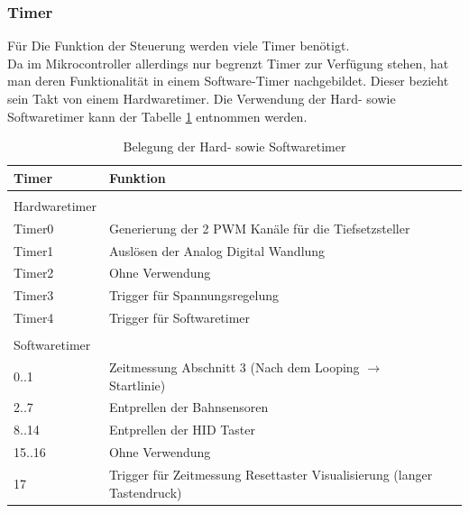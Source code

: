 \documentclass[a4paper, 11pt]{report}
\begin{document}
			\subsubsection{Timer}\label{subsubsec:Timer}
			Für Die Funktion der Steuerung werden viele Timer benötigt.\\
			Da im Mikrocontroller allerdings nur begrenzt Timer zur Verfügung stehen, hat man deren Funktionalität in einem Software-Timer nachgebildet.
			Dieser bezieht sein Takt von einem Hardwaretimer.
			Die Verwendung der Hard- sowie Softwaretimer kann der Tabelle \ref{tab:belegungTimer} entnommen werden.
				\begin{table}[ht]
					\begin{tabular}{|l|l|l|}
						\hline
						\textbf{Timer} & \textbf{Funktion}\\
						\hline
						\hline
						 & \\
						Hardwaretimer &\\
						\hline
						\hline
						Timer0 & Generierung der 2 PWM Kanäle für die Tiefsetzsteller\\
						\hline
						Timer1 & Auslösen der Analog Digital Wandlung\\
						\hline
						Timer2 & Ohne Verwendung\\
						\hline
						Timer3 & Trigger für Spannungsregelung\\
						\hline
						Timer4 & Trigger für Softwaretimer\\
						\hline
						\hline
						 & \\
						Softwaretimer &\\
						\hline
						\hline
						0..1 & Zeitmessung Abschnitt 3 (Nach dem Looping $\rightarrow$ Startlinie)\\
						\hline
						2..7 & Entprellen der Bahnsensoren\\
						\hline
						8..14 & Entprellen der HID Taster\\
						\hline
						15..16 & Ohne Verwendung\\
						\hline
						17 & Trigger für Zeitmessung Resettaster Visualisierung (langer Tastendruck)\\
						\hline
					\end{tabular}
					\caption{Belegung der Hard- sowie Softwaretimer}
					\label{tab:belegungTimer}
				\end{table}
\end{document}
